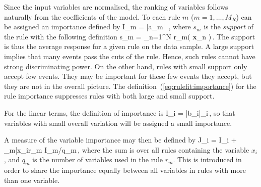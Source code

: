 Since the input variables are normalised, the ranking of variables follows naturally 
from the coefficients of the model. To each rule $m$ ($m=1,\dots,M_R$) can be assigned 
an importance defined by
\beq
\label{eq:rulefit:importance}
 I_m = |a_m| \,,
\eeq
where $s_m$ is the {\em support} of the rule with the following definition
\beq
 s_m =  \sum_{n=1}^N r_m( {\bf x}_n )\,.
\eeq
The support is thus the average response for a given rule on the data sample.
A large support implies that many events pass the cuts of the rule. Hence, such 
rules cannot have strong discriminating power. On the other hand, rules with small 
support only accept few events. They may be important for these few events they accept, 
but they are not in the overall picture. The definition~(\ref{eq:rulefit:importance}) 
for the rule importance suppresses rules with both large and small support.

For the linear terms, the definition of importance is
\beq
 I_i = |b_i|\cdot \sigma_{i}\,,
\eeq
so that variables with small overall variation will be assigned a 
small importance.

A measure of the variable importance may then be defined by
\beq
 J_i = I_i + \sum_{m|x_i\in r_m} I_m/q_m\,,
\eeq
where the sum is over all rules containing the variable $x_i$, and $q_m$ is the number of 
variables used in the rule $r_m$. This is introduced in order to share the importance 
equally between all variables in rules with more than one variable.

